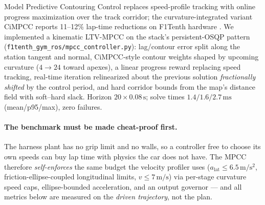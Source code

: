\documentclass[11pt]{article}
\begin{document}
Model Predictive Contouring Control \cite{liniger} replaces
speed-profile tracking with online progress maximization over the track
corridor; the curvature-integrated variant CiMPCC reports 11--12\%
lap-time reductions on F1Tenth hardware \cite{cimpcc}.  We implemented a
kinematic LTV-MPCC on the stack's persistent-OSQP pattern
(\texttt{f1tenth\_gym\_ros/mpcc\_controller.py}): lag/contour error
split along the station tangent and normal, CiMPCC-style contour
weights shaped by upcoming curvature ($4 \rightarrow 24$ toward
apexes), a linear progress reward replacing speed tracking, real-time
iteration relinearized about the previous solution \emph{fractionally
shifted} by the control period, and hard corridor bounds from the map's
distance field with soft--hard slack.  Horizon $20 \times
0.08\,\mathrm{s}$; solve times $1.4 / 1.6 / 2.7\,\mathrm{ms}$
(mean/p95/max), zero failures.

\paragraph{The benchmark must be made cheat-proof first.}
The harness plant has no grip limit and no walls, so a controller free
to choose its own speeds can buy lap time with physics the car does not
have.  The MPCC therefore \emph{self-enforces} the same budget the
velocity profiler uses ($a_{\mathrm{lat}} \le 6.5\,\mathrm{m/s^2}$,
friction-ellipse-coupled longitudinal limits, $v \le 7\,\mathrm{m/s}$)
via per-stage curvature speed caps, ellipse-bounded acceleration, and an
output governor --- and all metrics below are measured on the
\emph{driven trajectory}, not the plan.
\end{document}
